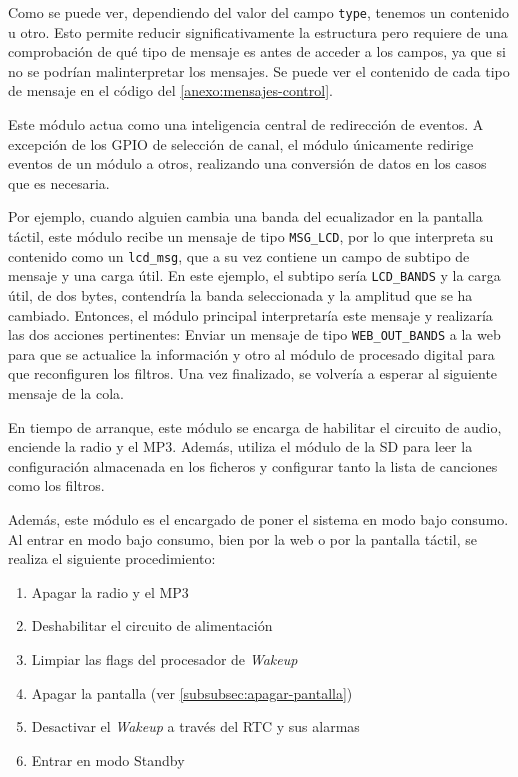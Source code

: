 Como se puede ver, dependiendo del valor del campo \texttt{type}, tenemos un contenido u otro. Esto permite reducir significativamente la estructura pero requiere de una comprobación de qué tipo de mensaje es antes de acceder a los campos, ya que si no se podrían malinterpretar los mensajes. Se puede ver el contenido de cada tipo de mensaje en el código del \autoref{anexo:mensajes-control}.

Este módulo actua como una inteligencia central de redirección de eventos. A excepción de los GPIO de selección de canal, el módulo únicamente redirige eventos de un módulo a otros, realizando una conversión de datos en los casos que es necesaria.

Por ejemplo, cuando alguien cambia una banda del ecualizador en la pantalla táctil, este módulo recibe un mensaje de tipo \texttt{MSG\_LCD}, por lo que interpreta su contenido como un \texttt{lcd\_msg}, que a su vez contiene un campo de subtipo de mensaje y una carga útil. En este ejemplo, el subtipo sería \texttt{LCD\_BANDS} y la carga útil, de dos bytes, contendría la banda seleccionada y la amplitud que se ha cambiado. Entonces, el módulo principal interpretaría este mensaje y realizaría las dos acciones pertinentes: Enviar un mensaje de tipo \texttt{WEB\_OUT\_BANDS} a la web para que se actualice la información y otro al módulo de procesado digital para que reconfiguren los filtros. Una vez finalizado, se volvería a esperar al siguiente mensaje de la cola.

En tiempo de arranque, este módulo se encarga de habilitar el circuito de audio, enciende la radio y el MP3. Además, utiliza el módulo de la SD para leer la configuración almacenada en los ficheros y configurar tanto la lista de canciones como los filtros.

Además, este módulo es el encargado de poner el sistema en modo bajo consumo. Al entrar en modo bajo consumo, bien por la web o por la pantalla táctil, se realiza el siguiente procedimiento:
\begin{enumerate}
    \item Apagar la radio y el MP3 
    \item Deshabilitar el circuito de alimentación
    \item Limpiar las flags del procesador de \textit{Wakeup}
    \item Apagar la pantalla (ver \autoref{subsubsec:apagar-pantalla})
    \item Desactivar el \textit{Wakeup} a través del RTC y sus alarmas
    \item Entrar en modo Standby
\end{enumerate}

